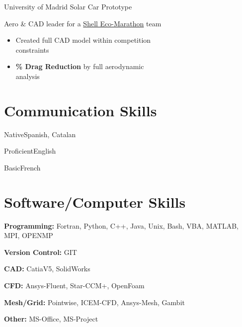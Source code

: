 \documentclass[fontsize=10pt]{tccv}
\begin{document}
\begin{eventlist}
     {University of Madrid}
     {Solar Car Prototype}

Aero \& CAD leader for a
\href{http://www.shell.com/global/environment-society/ecomarathon.html}{Shell
Eco-Marathon} team
\begin{itemize}
\itemsep -2pt
	\item Created full CAD model within competition \\constraints
	\item \textbf{\% Drag Reduction} by full aerodynamic \\analysis
\end{itemize}
\end{eventlist}

\section{Communication Skills}
\begin{factlist}
\item{Native}{Spanish, Catalan}
\item{Proficient}{English}
\item{Basic}{French}
\end{factlist}

\vspace{-20pt}
\section{Software/Computer Skills}
\begin{factlist}
\item{\textbf{Programming:}}
     {Fortran, Python, C++, Java, Unix, Bash, VBA, MATLAB, MPI, OPENMP}
\item{\textbf{Version Control:}}
     {GIT}
\item{\textbf{CAD:}}
     {CatiaV5, SolidWorks}
\item{\textbf{CFD:}}
     {Ansys-Fluent, Star-CCM+, OpenFoam}
\item{\textbf{Mesh/Grid:}}
     {Pointwise, ICEM-CFD, Ansys-Mesh, Gambit}
\item{\textbf{Other:}}
     {MS-Office, MS-Project}
\end{factlist}


\vspace{-20pt}
\end{document}
